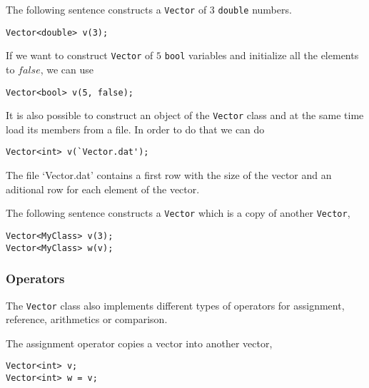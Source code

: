 
The following sentence constructs a \lstinline"Vector" of $3$
\lstinline"double" numbers.

\begin{lstlisting}
Vector<double> v(3);
\end{lstlisting}


If we want to construct \lstinline"Vector" of $5$ \lstinline"bool"
variables and initialize all the elements to $false$, we can use

\begin{lstlisting}
Vector<bool> v(5, false);
\end{lstlisting}


It is also possible to construct an object of the \lstinline"Vector" class and at the same time 
load its members from a file. In order to do that we can do

\begin{lstlisting}
Vector<int> v(`Vector.dat');
\end{lstlisting}

The file `Vector.dat' contains a first row with the size of the vector and an aditional row for each element of the vector. 


The following sentence constructs a \lstinline"Vector" which is a copy of another \lstinline"Vector",

\begin{lstlisting}
Vector<MyClass> v(3);
Vector<MyClass> w(v);
\end{lstlisting}

\subsubsection*{Operators}

The \lstinline"Vector" class also implements different types of operators for assignment, reference, arithmetics or comparison. 


The assignment operator copies a vector into another vector, 

\begin{lstlisting}
Vector<int> v;
Vector<int> w = v;
\end{lstlisting}


